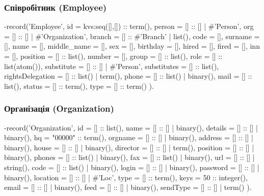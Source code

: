 \documentclass{article}
\let\originalfootnotesize\footnotesize
\let\oldverbatim\verbatim
\let\oldendverbatim\endverbatim
\renewenvironment{verbatim}{\originalfootnotesize\oldverbatim}{\oldendverbatim}
\begin{document}
\subsubsection{Співробітник (Employee)}
\begin{verbatim}
-record('Employee',    { id          = kvs:seq([],[]) :: term(),
                         person      = [] :: [] | #'Person'{},
                         org         = [] :: [] | #'Organization'{},
                         branch      = [] :: #'Branch'{} | list(),
                         code        = [],
                         surname     = [],
                         name        = [],
                         middle_name = [],
                         sex         = [],
                         birthday    = [],
                         hired       = [],
                         fired       = [],
                         inn         = [],
                         position    = [] :: list(),
                         number      = [],
                         group       = [] :: list(),
                         role        = [] :: list(atom()),
                         substitute  = [] :: [] | #'Person'{},
                         substitutes = [] :: list(),
                         rightsDelegation = [] :: list() | term(),
                         phone       = [] :: list() | binary(),
                         mail        = [] :: list(),
                         status      = [] :: term(),
                         type        = [] :: term() }).
\end{verbatim}

\subsubsection{Організація (Organization)}
\begin{verbatim}
-record('Organization', { id = [] :: list(),
                          name        = [] :: [] | binary(),
                          details     = [] :: [] | binary(),
                          hq          = "00000" :: term(),
                          orgname     = [] :: [] | binary(),
                          address     = [] :: [] | binary(),
                          house       = [] :: [] | binary(),
                          director    = [] :: [] | term(),
                          position    = [] :: [] | binary(),
                          phones      = [] :: list() | binary(),
                          fax         = [] :: list() | binary(),
                          url         = [] :: [] | string(),
                          code        = [] :: list() | binary(),
                          login       = [] :: [] | binary(),
                          password    = [] :: [] | binary(),
                          location    = [] :: [] | #'Loc'{},
                          type        = [] :: term(),
                          keys        = 50 :: integer(),
                          email       = [] :: [] | binary(),
                          feed        = [] :: [] | binary(),
                          sendType    = [] :: [] | term() }).
\end{verbatim}
\end{document}

